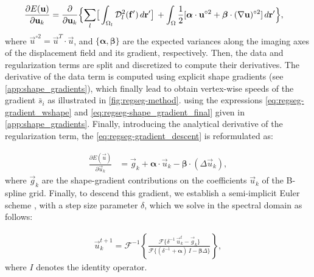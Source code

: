   \begin{align}
  \frac{\partial E(\vec{u})}{\partial \vec{u}_k} &=
  \frac{ \partial }{\partial \vec{u}_k} \Big\{
  \underset{l}{\sum} \big[ \int_{\Omega_l} \mdist{f'}{l} \,d\vec{r}' \big] \,
  + \int_{\Omega} \frac12 [ \boldsymbol{\alpha} \cdot \vec{u}^{\circ2}
  + \boldsymbol{\beta} \cdot (\nabla \vec{u})^{\circ2} ] \,d\vec{r}'
  \Big\},
  \label{eq:regseg-gradient_descent}
  \end{align}
  where $\vec{u}^{\circ2} = \vec{u}^T \cdot \vec{u}$,
  and $\{\boldsymbol{\alpha}, \boldsymbol{\beta}\}$ are the expected variances along
  the imaging axes of the displacement field and its gradient, respectively.
Then, the data and regularization terms are split and discretized to compute their
  derivatives.
The derivative of the data term is computed using explicit shape gradients (see \ref{app:shape_gradients}),
  which finally lead to obtain vertex-wise speeds of the gradient $\bar{s}_i$ as
  illustrated in \autoref{fig:regseg-method}.
%
using the expressions \eqref{eq:regseg-gradient_wshape} and 
  \eqref{eq:regseg-shape_gradient_final} given in \ref{app:shape_gradients}.
Finally, introducing the analytical derivative of the regularization term,
  the \autoref{eq:regseg-gradient_descent} is reformulated as:

  \begin{align}
  \frac{\partial E(\vec{u})}{\partial \vec{u}_k} &=
  \vec{g}_k  + \boldsymbol{\alpha} \cdot \vec{u}_k - \boldsymbol{\beta} \cdot (\Delta \vec{u}_k),
  \label{eq:regseg-final_gradient}
  \end{align}
where $\vec{g}_k$ are the shape-gradient contributions on the coefficients $\vec{u}_k$ of the B-spline grid.
Finally, to descend this gradient, we establish a semi-implicit Euler scheme
  ,
  with a step size parameter $\delta$, which we solve in the spectral domain as follows:

  \begin{align}
  \vec{u}_k^{t+1} = \mathcal{F}^{-1}\left\{ \frac{\mathcal{F}\{\delta^{-1} \, \vec{u}_k^t - \vec{g}_k\} }
                    {\mathcal{F}\{(\delta^{-1} + \boldsymbol{\alpha})\, I - \boldsymbol{\beta}\Delta\}} \right\},
  \label{eq:regseg-update_equation}
  \end{align}
  where $I$ denotes the identity operator.


